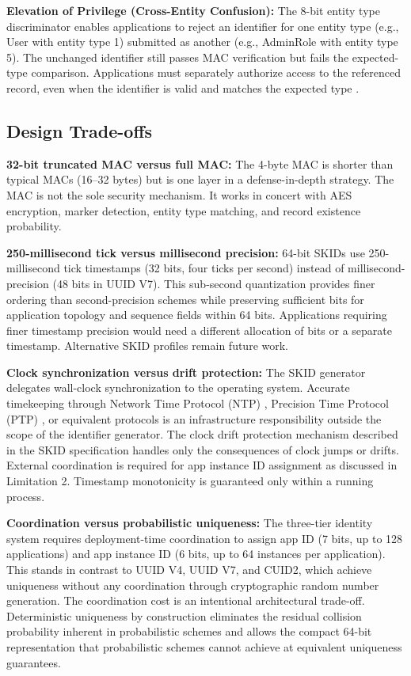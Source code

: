 \documentclass[a4paper,fleqn]{cas-sc}
\begin{document}
\textbf{Elevation of Privilege (Cross-Entity Confusion):} The 8-bit
entity type discriminator enables applications to reject an identifier
for one entity type (e.g., User with entity type 1) submitted as another
(e.g., AdminRole with entity type 5). The unchanged identifier still
passes MAC verification but fails the expected-type comparison.
Applications must separately authorize access to the referenced record,
even when the identifier is valid and matches the expected type
\citep{cwe639}.

\subsection{Design Trade-offs}\label{design-trade-offs}

\textbf{32-bit truncated MAC versus full MAC:} The 4-byte MAC is shorter
than typical MACs (16--32 bytes) but is one layer in a defense-in-depth
strategy. The MAC is not the sole security mechanism. It works in
concert with AES encryption, marker detection, entity type matching, and
record existence probability.

\textbf{250-millisecond tick versus millisecond precision:} 64-bit SKIDs
use 250-millisecond tick timestamps (32 bits, four ticks per second)
instead of millisecond-precision (48 bits in UUID V7). This sub-second
quantization provides finer ordering than second-precision schemes while
preserving sufficient bits for application topology and sequence fields
within 64 bits. Applications requiring finer timestamp precision would
need a different allocation of bits or a separate timestamp. Alternative
SKID profiles remain future work.

\textbf{Clock synchronization versus drift protection:} The SKID
generator delegates wall-clock synchronization to the operating system.
Accurate timekeeping through Network Time Protocol (NTP)
\citep{rfc5905}, Precision Time Protocol (PTP) \citep{ieee1588}, or
equivalent protocols is an infrastructure responsibility outside the
scope of the identifier generator. The clock drift protection mechanism
described in the SKID specification handles only the consequences of
clock jumps or drifts. External coordination is required for app
instance ID assignment as discussed in Limitation 2. Timestamp
monotonicity is guaranteed only within a running process.

\textbf{Coordination versus probabilistic uniqueness:} The three-tier
identity system requires deployment-time coordination to assign app ID
(7 bits, up to 128 applications) and app instance ID (6 bits, up to 64
instances per application). This stands in contrast to UUID V4, UUID V7,
and CUID2, which achieve uniqueness without any coordination through
cryptographic random number generation. The coordination cost is an
intentional architectural trade-off. Deterministic uniqueness by
construction eliminates the residual collision probability inherent in
probabilistic schemes and allows the compact 64-bit representation that
probabilistic schemes cannot achieve at equivalent uniqueness
guarantees.
\end{document}
